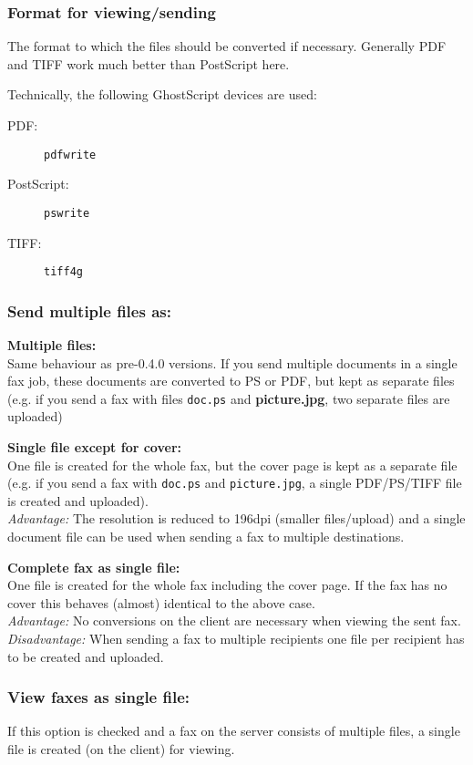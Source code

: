 \documentclass[a4paper,10pt]{scrartcl}
\begin{document}
\subsubsection{Format for viewing/sending}

The format to which the files should be converted if necessary. Generally PDF and TIFF work much better than PostScript here.

Technically, the following GhostScript devices are used:
\begin{description}
 \item[PDF:] \texttt{pdfwrite}
 \item[PostScript:] \texttt{pswrite}
 \item[TIFF:] \texttt{tiff4g}
 \end{description}

\subsubsection{Send multiple files as:}

{\parindent0pt
\textbf{Multiple files:}\\
Same behaviour as pre-0.4.0 versions. If you send multiple documents in a single fax job, these documents are converted to PS or PDF, but kept as separate files (e.g. if you send a fax with files \texttt{doc.ps} and \textbf{picture.jpg}, two separate files are uploaded)
\medskip

\textbf{Single file except for cover:}\\
One file is created for the whole fax, but the cover page is kept as a separate file (e.g. if you send a fax with \texttt{doc.ps} and \texttt{picture.jpg}, a single PDF/PS/TIFF file is created and uploaded).\\
\textit{Advantage:} The resolution is reduced to 196dpi (\textrightarrow smaller files/upload) and a single document file can be used when sending a fax to multiple destinations.
\medskip

\textbf{Complete fax as single file:}\\
One file is created for the whole fax including the cover page. If the fax has no cover this behaves (almost) identical to the above case.\\
\textit{Advantage:} No conversions on the client are necessary when viewing the sent fax.\\
\textit{Disadvantage:} When sending a fax to multiple recipients one file per recipient has to be created and uploaded.

\subsubsection{View faxes as single file:}
If this option is checked and a fax on the server consists of multiple files, a single file is created (on the client) for viewing.
}
\end{document}
